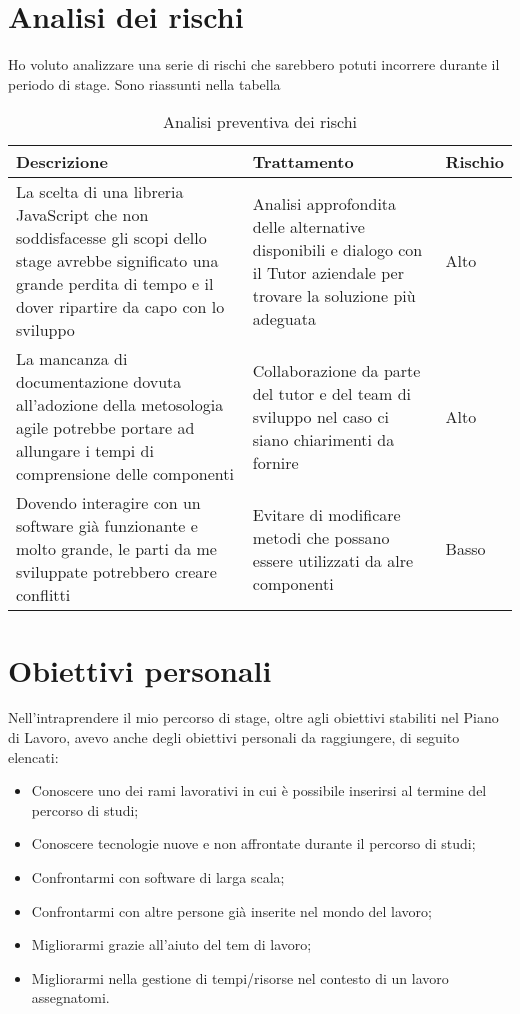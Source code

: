 \section {Analisi dei rischi}
Ho voluto analizzare una serie di rischi che sarebbero potuti incorrere durante il periodo di stage. Sono riassunti nella tabella\\ %

\begin{table} %
\centering
\caption{Analisi preventiva dei rischi}
\label{tab:analisi-dei-rischi}
\begin{tabular}{|p{5cm}|p{5cm}|p{3cm}|}
\hline
Descrizione & Trattamento & Rischio\\
\hline
La scelta di una libreria JavaScript che non soddisfacesse gli scopi dello stage avrebbe significato una grande perdita di tempo e il dover ripartire da capo con lo sviluppo & Analisi approfondita delle alternative disponibili e dialogo con il Tutor aziendale per trovare la soluzione più adeguata & Alto\\
\hline
La mancanza di documentazione dovuta all'adozione della metosologia agile potrebbe portare ad allungare i tempi di comprensione delle componenti & Collaborazione da parte del tutor e del team di sviluppo nel caso ci siano chiarimenti da fornire & Alto\\
\hline
Dovendo interagire con un software già funzionante e molto grande, le parti da me sviluppate potrebbero creare conflitti & Evitare di modificare metodi che possano essere utilizzati da alre componenti & Basso\\
\hline

\end{tabular}
\end{table}

\section {Obiettivi personali}
Nell'intraprendere il mio percorso di stage, oltre agli obiettivi stabiliti nel Piano di Lavoro, avevo anche degli obiettivi personali da raggiungere, di seguito elencati:
\begin{itemize}
\item Conoscere uno dei rami lavorativi in cui è possibile inserirsi al termine del percorso di studi;
\item Conoscere tecnologie nuove e non affrontate durante il percorso di studi;
\item Confrontarmi con software di larga scala;
\item Confrontarmi con altre persone già inserite nel mondo del lavoro;
\item Migliorarmi grazie all'aiuto del tem di lavoro;
\item Migliorarmi nella gestione di tempi/risorse nel contesto di un lavoro assegnatomi.
\end{itemize}

\newpage